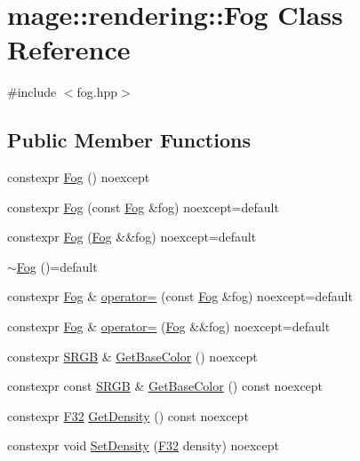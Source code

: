 \hypertarget{classmage_1_1rendering_1_1_fog}{}\section{mage\+:\+:rendering\+:\+:Fog Class Reference}
\label{classmage_1_1rendering_1_1_fog}


{\ttfamily \#include $<$fog.\+hpp$>$}

\subsection*{Public Member Functions}
\begin{DoxyCompactItemize}
\item 
constexpr \hyperlink{classmage_1_1rendering_1_1_fog_a48489b0ce940aff4395eb5ea88394081}{Fog} () noexcept
\item 
constexpr \hyperlink{classmage_1_1rendering_1_1_fog_a2f730d70ed426468f113d44e7810394b}{Fog} (const \hyperlink{classmage_1_1rendering_1_1_fog}{Fog} \&fog) noexcept=default
\item 
constexpr \hyperlink{classmage_1_1rendering_1_1_fog_aeed9b3fc18dabe37199c51ed7c4f5930}{Fog} (\hyperlink{classmage_1_1rendering_1_1_fog}{Fog} \&\&fog) noexcept=default
\item 
\hyperlink{classmage_1_1rendering_1_1_fog_a3dfb641a2c5688172e3c4be7c91631a2}{$\sim$\+Fog} ()=default
\item 
constexpr \hyperlink{classmage_1_1rendering_1_1_fog}{Fog} \& \hyperlink{classmage_1_1rendering_1_1_fog_a6197ad3df06e461c7cb2f5028f8cd901}{operator=} (const \hyperlink{classmage_1_1rendering_1_1_fog}{Fog} \&fog) noexcept=default
\item 
constexpr \hyperlink{classmage_1_1rendering_1_1_fog}{Fog} \& \hyperlink{classmage_1_1rendering_1_1_fog_ae0b197b983b73f78782fecfc491ddd1c}{operator=} (\hyperlink{classmage_1_1rendering_1_1_fog}{Fog} \&\&fog) noexcept=default
\item 
constexpr \hyperlink{structmage_1_1_s_r_g_b}{S\+R\+GB} \& \hyperlink{classmage_1_1rendering_1_1_fog_a514b3e11c7c3eb64b2b696278442eee6}{Get\+Base\+Color} () noexcept
\item 
constexpr const \hyperlink{structmage_1_1_s_r_g_b}{S\+R\+GB} \& \hyperlink{classmage_1_1rendering_1_1_fog_af8ab44c1cb0667ae4a439e2798f2e9e4}{Get\+Base\+Color} () const noexcept
\item 
constexpr \hyperlink{namespacemage_aa97e833b45f06d60a0a9c4fc22ae02c0}{F32} \hyperlink{classmage_1_1rendering_1_1_fog_ac99a5479a39027723807296c49fdfbc8}{Get\+Density} () const noexcept
\item 
constexpr void \hyperlink{classmage_1_1rendering_1_1_fog_a9b498c71c58e28bd58b09e4385338a13}{Set\+Density} (\hyperlink{namespacemage_aa97e833b45f06d60a0a9c4fc22ae02c0}{F32} density) noexcept
\end{DoxyCompactItemize}
